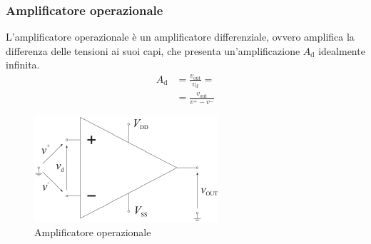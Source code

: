 \documentclass[a4paper]{article}
\begin{document}
			\subsubsection{Amplificatore operazionale}
				L'amplificatore operazionale è un amplificatore differenziale, ovvero amplifica la differenza delle tensioni ai suoi capi, che presenta un'amplificazione $ A_{\mathrm{d}} $ idealmente infinita.
				\begin{equation*}
					\begin{split}
						A_{\mathrm{d}} &= \frac{v_{\mathrm{out}}}{v_{\mathrm{d}}} = \\
									   &= \frac{v_{\mathrm{out}}}{v^{+} - v^{-}}
					\end{split}
				\end{equation*}
				\begin{figure}[h!]
					\centering
					\includegraphics[scale=0.7]{amplificatoreOperazionale}
					\caption{Amplificatore operazionale}
					\label{fig:amplificatoreOperazionale}
				\end{figure}
\end{document}
